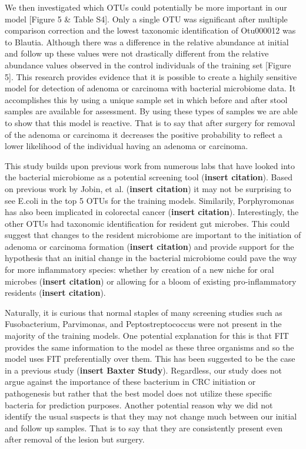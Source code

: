 \documentclass[12pt,]{article}
\begin{document}
We then investigated which OTUs could potentially be more important in
our model {[}Figure 5 \& Table S4{]}. Only a single OTU was significant
after multiple comparison correction and the lowest taxonomic
identification of Otu000012 was to Blautia. Although there was a
difference in the relative abundance at initial and follow up these
values were not drastically different from the relative abundance values
observed in the control individuals of the training set {[}Figure 5{]}.
This research provides evidence that it is possible to create a highily
sensitive model for detection of adenoma or carcinoma with bacterial
microbiome data. It accomplishes this by using a unique sample set in
which before and after stool samples are available for assessment. By
using these types of samples we are able to show that this model is
reactive. That is to say that after surgery for removal of the adenoma
or carcinoma it decreases the positive probability to reflect a lower
likelihood of the individual having an adenoma or carcinoma.

This study builds upon previous work from numerous labs that have looked
into the bacterial microbiome as a potential screening tool
(\textbf{insert citation}). Based on previous work by Jobin, et al.
(\textbf{insert citation}) it may not be surprising to see E.coli in the
top 5 OTUs for the training models. Similarily, Porphyromonas has also
been implicated in colorectal cancer (\textbf{insert citation}).
Interestingly, the other OTUs had taxonomic identification for resident
gut microbes. This could suggest that changes to the resident microbiome
are important to the initiation of adenoma or carcinoma formation
(\textbf{insert citation}) and provide support for the hypothesis that
an initial change in the bacterial microbiome could pave the way for
more inflammatory species: whether by creation of a new niche for oral
microbes (\textbf{insert citation}) or allowing for a bloom of existing
pro-inflammatory residents (\textbf{insert citation}).

Naturally, it is curious that normal staples of many screening studies
such as Fusobacterium, Parvimonas, and Peptostreptococcus were not
present in the majority of the training models. One potential
explanation for this is that FIT provides the same information to the
model as these three organisms and so the model uses FIT preferentially
over them. This has been suggested to be the case in a previous study
(\textbf{insert Baxter Study}). Regardless, our study does not argue
against the importance of these bacterium in CRC initiation or
pathogenesis but rather that the best model does not utilize these
specific bacteria for prediction purposes. Another potential reason why
we did not identify the usual suspects is that they may not change much
between our initial and follow up samples. That is to say that they are
consistently present even after removal of the lesion but surgery.
\end{document}
